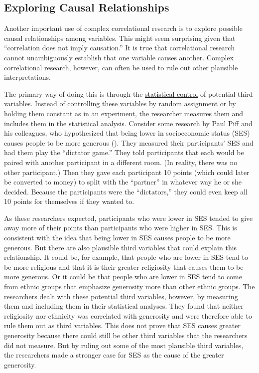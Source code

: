 \documentclass[
]{krantz}
\begin{document}
\subsection*{Exploring Causal Relationships}\label{exploring-causal-relationships}


Another important use of complex correlational research is to explore possible causal relationships among variables. This might seem surprising given that ``correlation does not imply causation.'' It is true that correlational research cannot unambiguously establish that one variable causes another. Complex correlational research, however, can often be used to rule out other plausible interpretations.

The primary way of doing this is through the \hyperref[statistical-control]{statistical control} of potential third variables. Instead of controlling these variables by random assignment or by holding them constant as in an experiment, the researcher measures them and includes them in the statistical analysis. Consider some research by Paul Piff and his colleagues, who hypothesized that being lower in socioeconomic status (SES) causes people to be more generous (). They measured their participants' SES and had them play the ``dictator game.'' They told participants that each would be paired with another participant in a different room. (In reality, there was no other participant.) Then they gave each participant 10 points (which could later be converted to money) to split with the ``partner'' in whatever way he or she decided. Because the participants were the ``dictators,'' they could even keep all 10 points for themselves if they wanted to.

As these researchers expected, participants who were lower in SES tended to give away more of their points than participants who were higher in SES. This is consistent with the idea that being lower in SES causes people to be more generous. But there are also plausible third variables that could explain this relationship. It could be, for example, that people who are lower in SES tend to be more religious and that it is their greater religiosity that causes them to be more generous. Or it could be that people who are lower in SES tend to come from ethnic groups that emphasize generosity more than other ethnic groups. The researchers dealt with these potential third variables, however, by measuring them and including them in their statistical analyses. They found that neither religiosity nor ethnicity was correlated with generosity and were therefore able to rule them out as third variables. This does not prove that SES causes greater generosity because there could still be other third variables that the researchers did not measure. But by ruling out some of the most plausible third variables, the researchers made a stronger case for SES as the cause of the greater generosity.
\end{document}
